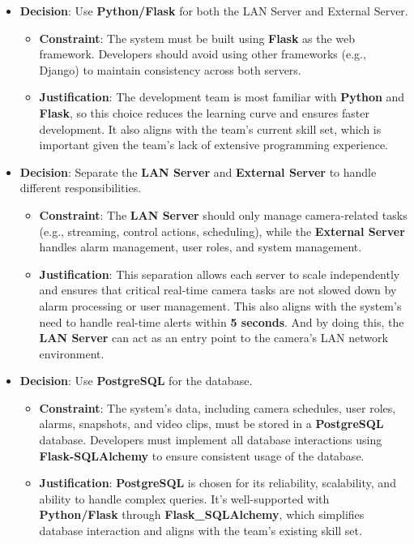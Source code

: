 \documentclass{article}
\begin{document}
\begin{itemize}
    \item \textbf{Decision}: Use \textbf{Python/Flask} for both the LAN Server and External Server.
    \begin{itemize}
        \item \textbf{Constraint}: The system must be built using \textbf{Flask} as the web framework. Developers should avoid using other frameworks (e.g., Django) to maintain consistency across both servers.
        \item \textbf{Justification}: The development team is most familiar with \textbf{Python} and \textbf{Flask}, so this choice reduces the learning curve and ensures faster development. It also aligns with the team’s current skill set, which is important given the team's lack of extensive programming experience.
    \end{itemize}
    \item \textbf{Decision}: Separate the \textbf{LAN Server} and \textbf{External Server} to handle different responsibilities.
    \begin{itemize}
        \item \textbf{Constraint}: The \textbf{LAN Server} should only manage camera-related tasks (e.g., streaming, control actions, scheduling), while the \textbf{External Server} handles alarm management, user roles, and system management.
        \item \textbf{Justification}: This separation allows each server to scale independently and ensures that critical real-time camera tasks are not slowed down by alarm processing or user management. This also aligns with the system's need to handle real-time alerts within \textbf{5 seconds}. And by doing this, the \textbf{LAN Server} can act as an entry point to the camera's LAN network environment.
    \end{itemize}
    \item \textbf{Decision}: Use \textbf{PostgreSQL} for the database.
    \begin{itemize}
        \item \textbf{Constraint}: The system’s data, including camera schedules, user roles, alarms, snapshots, and video clips, must be stored in a \textbf{PostgreSQL} database. Developers must implement all database interactions using \textbf{Flask-SQLAlchemy} to ensure consistent usage of the database.
        \item \textbf{Justification}: \textbf{PostgreSQL} is chosen for its reliability, scalability, and ability to handle complex queries. It's well-supported with \textbf{Python/Flask} through \textbf{Flask\_SQLAlchemy}, which simplifies database interaction and aligns with the team’s existing skill set.

\end{itemize}
\end{itemize}
\end{document}
